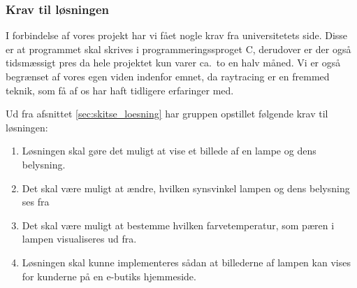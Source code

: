 \subsubsection{Krav til løsningen}
\label{sec:krav}

I forbindelse af vores projekt har vi fået nogle krav fra universitetets side. Disse er at programmet skal skrives i programmeringssproget C, derudover er der også tidsmæssigt pres da hele projektet kun varer ca.\ to en halv måned. 
Vi er også begrænset af vores egen viden indenfor emnet, da raytracing er en fremmed teknik, som få af os har haft tidligere erfaringer med. 

Ud fra afsnittet \ref{sec:skitse_loesning} har gruppen opstillet følgende krav til løsningen:
\begin{enumerate}
    \item Løsningen skal gøre det muligt at vise et billede af en lampe og dens belysning.
    \item Det skal være muligt at ændre, hvilken synsvinkel lampen og dens belysning ses fra
    \item Det skal være muligt at bestemme hvilken farvetemperatur, som pæren i lampen visualiseres ud fra.
    \item Løsningen skal kunne implementeres sådan at billederne af lampen kan vises for kunderne på en e-butiks hjemmeside.
\end{enumerate}